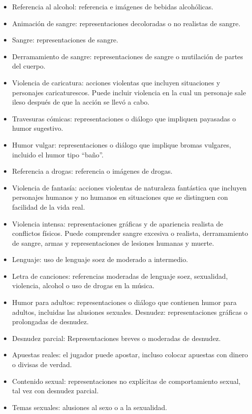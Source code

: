 \documentclass{article}
\begin{document}
			\begin{itemize}
				\item Referencia al alcohol: referencia e imágenes de bebidas alcohólicas.
				\item Animación de sangre: representaciones decoloradas o no realistas de sangre.
				\item Sangre: representaciones de sangre.
				\item Derramamiento de sangre: representaciones de sangre o mutilación de partes del cuerpo.
				\item Violencia de caricatura: acciones violentas que incluyen situaciones y personajes caricaturescos. Puede incluir violencia en la cual un personaje sale ileso después de que la acción se llevó a cabo.
				\item Travesuras cómicas: representaciones o diálogo que impliquen payasadas o humor sugestivo.
				\item Humor vulgar: representaciones o diálogo que implique bromas vulgares, incluido el humor tipo “baño”.
				\item Referencia a drogas: referencia o imágenes de drogas.
				\item Violencia de fantasía: acciones violentas de naturaleza fantástica que incluyen personajes humanos y no humanos en situaciones que se distinguen con facilidad de la vida real.
				\item Violencia intensa: representaciones gráficas y de apariencia realista de conflictos físicos. Puede comprender sangre excesiva o realista, derramamiento de sangre, armas y representaciones de lesiones humanas y muerte.
				\item Lenguaje: uso de lenguaje soez de moderado a intermedio.
				\item Letra de canciones: referencias moderadas de lenguaje soez, sexualidad, violencia, alcohol o uso de drogas en la música.
				\item Humor para adultos: representaciones o diálogo que contienen humor para adultos, incluidas las alusiones sexuales.
				Desnudez: representaciones gráficas o prolongadas de desnudez.
				\item Desnudez parcial: Representaciones breves o moderadas de desnudez.
				\item Apuestas reales: el jugador puede apostar, incluso colocar apuestas con dinero o divisas de verdad.
				\item Contenido sexual: representaciones no explícitas de comportamiento sexual, tal vez con desnudez parcial.
				\item Temas sexuales: alusiones al sexo o a la sexualidad.

\end{itemize}
\end{document}
